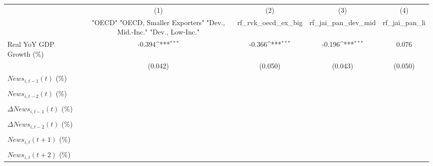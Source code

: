 {
\def\sym#1{\ifmmode^{#1}\else\(^{#1}\)\fi}
\begin{tabular}{l*{4}{c}}
\toprule
                    &\multicolumn{1}{c}{(1)}&\multicolumn{1}{c}{(2)}&\multicolumn{1}{c}{(3)}&\multicolumn{1}{c}{(4)}\\
                    &\multicolumn{1}{c}{ "OECD" "OECD, Smaller Exporters" "Dev., Mid.-Inc." "Dev., Low-Inc."}&\multicolumn{1}{c}{rf_rvk_oecd_ex_big}&\multicolumn{1}{c}{rf_jai_pan_dev_mid}&\multicolumn{1}{c}{rf_jai_pan_li}\\
\midrule
Real YoY GDP Growth (\%)&      -0.394\sym{***}&      -0.366\sym{***}&      -0.196\sym{***}&       0.076         \\
                    &     (0.042)         &     (0.050)         &     (0.043)         &     (0.050)         \\
\addlinespace
$ News_{i,t-1}(t)$ (\%)&                     &                     &                     &                     \\
                    &                     &                     &                     &                     \\
\addlinespace
$ News_{i,t-2}(t)$ (\%)&                     &                     &                     &                     \\
                    &                     &                     &                     &                     \\
\addlinespace
$ \Delta News_{i,t-1}(t)$ (\%)&                     &                     &                     &                     \\
                    &                     &                     &                     &                     \\
\addlinespace
$ \Delta News_{i,t-2}(t)$ (\%)&                     &                     &                     &                     \\
                    &                     &                     &                     &                     \\
\addlinespace
$ News_{i,t}(t+1)$ (\%)&                     &                     &                     &                     \\
                    &                     &                     &                     &                     \\
\addlinespace
$ News_{i,t}(t+2)$ (\%)&                     &                     &                     &                     \\

\end{tabular}}
